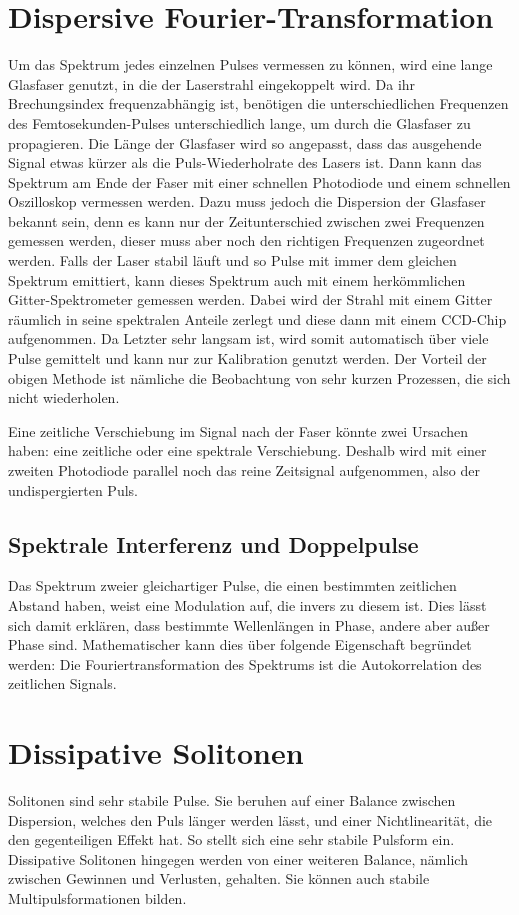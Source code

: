 \documentclass[bachelor,       %
               twoside,        %
               BCOR10mm,       %
               english,ngerman, %
               ]{GAUBM}
\begin{document}
\section{Dispersive Fourier-Transformation}
Um das Spektrum jedes einzelnen Pulses vermessen zu können, wird eine lange Glasfaser genutzt, in die der Laserstrahl eingekoppelt wird.
Da ihr Brechungsindex frequenzabhängig ist, benötigen die unterschiedlichen Frequenzen des Femtosekunden-Pulses unterschiedlich lange, um durch die Glasfaser zu propagieren.
Die Länge der Glasfaser wird so angepasst, dass das ausgehende Signal etwas kürzer als die Puls-Wiederholrate des Lasers ist.
Dann kann das Spektrum am Ende der Faser mit einer schnellen Photodiode und einem schnellen Oszilloskop vermessen werden.
Dazu muss jedoch die Dispersion der Glasfaser bekannt sein, denn es kann nur der Zeitunterschied zwischen zwei Frequenzen gemessen werden, dieser muss aber noch den richtigen Frequenzen zugeordnet werden.
Falls der Laser stabil läuft und so Pulse mit immer dem gleichen Spektrum emittiert, kann dieses Spektrum auch mit einem herkömmlichen Gitter-Spektrometer gemessen werden.
Dabei wird der Strahl mit einem Gitter räumlich in seine spektralen Anteile zerlegt und diese dann mit einem CCD-Chip aufgenommen.
Da Letzter sehr langsam ist, wird somit automatisch über viele Pulse gemittelt und kann nur zur Kalibration genutzt werden.
Der Vorteil der obigen Methode ist nämliche die Beobachtung von sehr kurzen Prozessen, die sich nicht wiederholen.

Eine zeitliche Verschiebung im Signal nach der Faser könnte zwei Ursachen haben: eine zeitliche oder eine spektrale Verschiebung.
Deshalb wird mit einer zweiten Photodiode parallel noch das reine Zeitsignal aufgenommen, also der undispergierten Puls.

\subsection{Spektrale Interferenz und Doppelpulse}
Das Spektrum zweier gleichartiger Pulse, die einen bestimmten zeitlichen Abstand haben, weist eine Modulation auf, die invers zu diesem ist.
Dies lässt sich damit erklären, dass bestimmte Wellenlängen in Phase, andere aber außer Phase sind.
Mathematischer kann dies über folgende Eigenschaft begründet werden:
Die Fouriertransformation des Spektrums ist die Autokorrelation des zeitlichen Signals.

\section{Dissipative Solitonen}
Solitonen sind sehr stabile Pulse.
Sie beruhen auf einer Balance zwischen Dispersion, welches den Puls länger werden lässt, und einer Nichtlinearität, die den gegenteiligen Effekt hat.
So stellt sich eine sehr stabile Pulsform ein.
Dissipative Solitonen hingegen werden von einer weiteren Balance, nämlich zwischen Gewinnen und Verlusten, gehalten.
Sie können auch stabile Multipulsformationen bilden.
\end{document}
